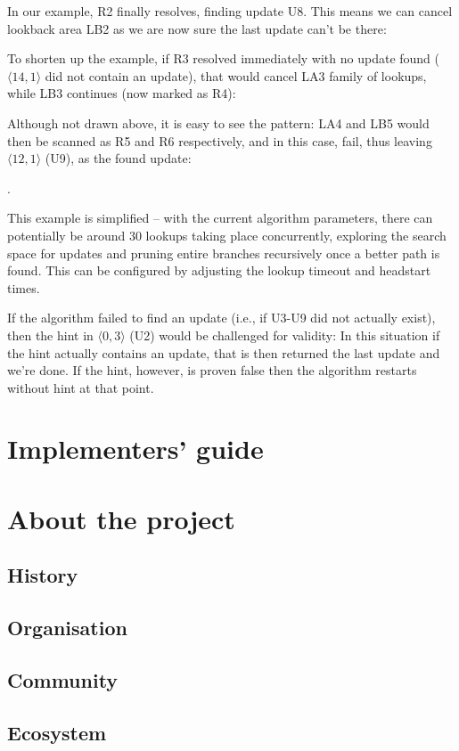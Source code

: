 In our example, R2 finally resolves, finding update U8. This means we can cancel lookback area LB2 as we are now sure the last update can't be there:


To shorten up the example, if R3 resolved immediately with no update found ($\langle  14, 1 \rangle$ did not contain an update), that would cancel LA3 family of lookups, while LB3 continues (now marked as R4):


Although not drawn above, it is easy to see the pattern: LA4 and LB5 would then be scanned as R5 and R6 respectively, and in this case, fail, thus leaving $\langle  12, 1 \rangle$ (U9), as the found update:


.

This example is simplified -- with the current algorithm parameters, there can potentially be around 30 lookups taking place concurrently, exploring the search space for updates and pruning entire branches recursively once a better path is found. This can be configured by adjusting the lookup timeout and headstart times.

If the algorithm failed to find an update (i.e., if U3-U9 did not actually exist), then the hint in $\langle  0, 3 \rangle$ (U2) would be challenged for validity: In this situation if the hint actually contains an update, that is then returned the last update and we're done. If the hint, however, is proven false then the algorithm restarts without hint at that point.


\chapter{Implementers' guide}\label{sec:implementor-guide}



\chapter{About the project \statusred}\label{sec:about}
\section{History \statusred}
\section{Organisation \statusred}
\section{Community \statusred}
\section{Ecosystem \statusred}